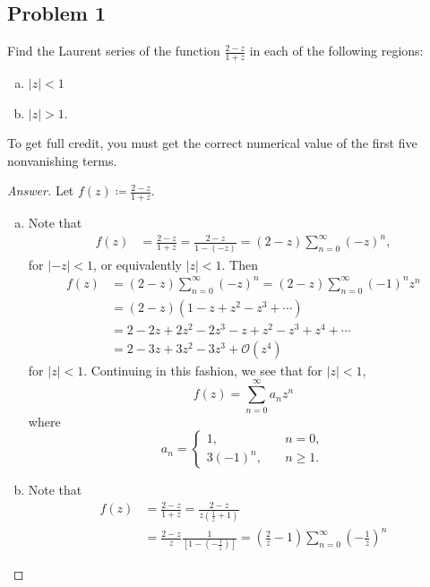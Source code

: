\documentclass[12pt]{article}
\newcommand\paren[1]{\left( #1 \right)}
\newcommand{\sqbrack}[1]{\left [ #1 \right ]}
\newcommand{\ds}{\displaystyle}
\theoremstyle{definition}
\begin{document}
\subsection{Problem 1}
Find the Laurent series of the function $\ds \frac{2-z}{1+z}$ in each of the following regions:
\begin{enumerate}[(a)]
    \item $|z| < 1$
    \item $|z| > 1$.
\end{enumerate}
To get full credit, you must get the correct numerical value of the first five nonvanishing terms.
\begin{proof}[Answer]
    Let $\ds f(z) \coloneqq \frac{2-z}{1+z}$.
    \begin{enumerate}[(a)]
        \item Note that
        \begin{align*}
            f(z) & = \frac{2-z}{1+z} = \frac{2-z}{1-(-z)} = (2-z) \sum\limits_{n = 0}^{\infty} (-z)^n,
        \end{align*}
        for $|-z| < 1$, or equivalently $|z| < 1$. Then 
        \begin{align*}
            f(z) & = (2-z) \sum\limits_{n = 0}^{\infty} (-z)^n = (2 - z) \sum\limits_{n = 0}^{\infty} (-1)^n z^n \\
            & = (2 - z) \paren{ 1 - z + z^2 - z^3 + \dotsb } \\
            & = 2 - 2z + 2z^2 - 2z^3 - z + z^2 - z^3 + z^4 + \dotsb \\
            & = 2 - 3z + 3z^2 - 3z^3 + \mathcal{O} \paren{ z^4 }
        \end{align*}
        for $|z| < 1$. Continuing in this fashion, we see that for $|z| < 1$, 
        \[
            f(z) = \sum\limits_{n = 0}^{\infty} a_n z^n
        \]
        where 
        \[
            a_n = 
            \begin{cases}
                1 , & \quad n = 0 , \\
                3 (-1)^n , & \quad n \geq 1.
            \end{cases}
        \]
        \item Note that 
        \begin{align*}
            f(z) & = \frac{2-z}{1+z} = \frac{2-z}{ z \paren{ \frac{1}{z} + 1 } } \\
            & = \frac{2-z}{z} \frac{1}{ \sqbrack{ 1 - \paren{ -\frac{1}{z} } } } = \paren{ \frac{2}{z} - 1 } \sum\limits_{n = 0}^{\infty} \paren{ -\frac{1}{z} }^n
        \end{align*}

\end{enumerate}
\end{proof}
\end{document}
